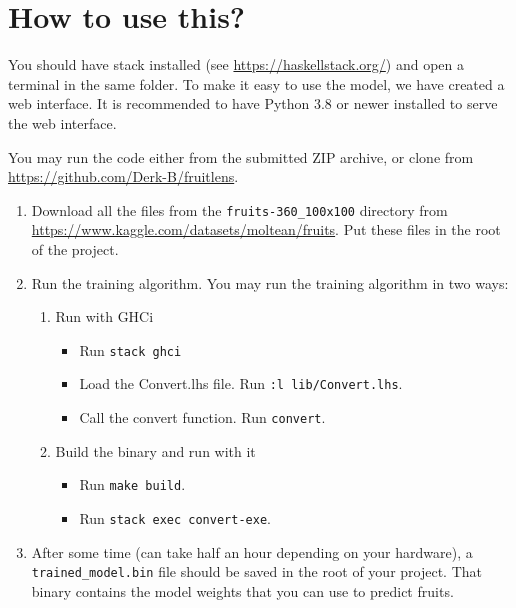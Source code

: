 \section{How to use this?}

You should have stack installed (see \url{https://haskellstack.org/}) and open a terminal in the same folder. To make it easy to use the model, we have created a web interface. It is recommended to have Python 3.8 or newer installed to serve the web interface.

You may run the code either from the submitted ZIP archive, or clone from \url{https://github.com/Derk-B/fruitlens}.  

\begin{enumerate}
  \item Download all the files from the \texttt{fruits-360\_100x100} directory from \url{https://www.kaggle.com/datasets/moltean/fruits}. Put these files in the root of the project.
  \item Run the training algorithm. You may run the training algorithm in two ways: 
  \begin{enumerate}
      \item Run with GHCi
        \begin{itemize}
          \item Run \verb|stack ghci| 
          \item Load the Convert.lhs file. Run \verb|:l lib/Convert.lhs|. 
          \item Call the convert function. Run \verb|convert|.
        \end{itemize}
      \item Build the binary and run with it
        \begin{itemize}
            \item Run \verb|make build|.
            \item Run \verb|stack exec convert-exe|.
        \end{itemize}
  \end{enumerate}
  \item After some time (can take half an hour depending on your hardware), a \texttt{trained\_model.bin} file should be saved in the root of your project. That binary contains the model weights that you can use to predict fruits.



\end{enumerate}
